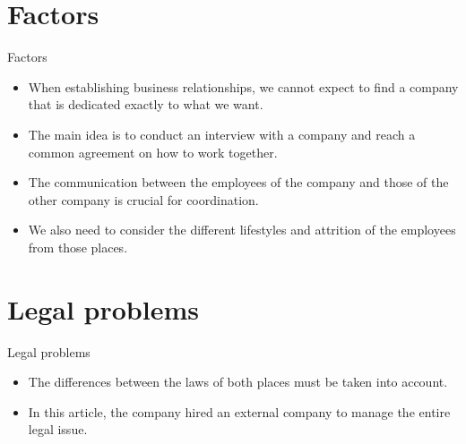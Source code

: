 \documentclass{beamer}
\begin{document}
\section{Factors}
\begin{frame}{Factors}
\begin{itemize}
	\item When establishing business relationships, we cannot expect to find a company that is dedicated exactly to what we want.\\
	
	\item The main idea is to conduct an interview with a company and reach a common agreement on how to work together.\\
	
	\item The communication between the employees of the company and those of the other company is crucial for coordination.\\
	
	\item We also need to consider the different lifestyles and attrition of the employees from those places.
\end{itemize}
\end{frame}

\section{Legal problems}
\begin{frame}{Legal problems}
	\begin{itemize}
		\item The differences between the laws of both places must be taken into account.\\
		
		\item In this article, the company hired an external company to manage the entire legal issue.
	\end{itemize}
\end{frame}
\end{document}
